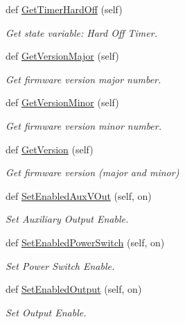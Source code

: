 \begin{DoxyCompactItemize}
def \hyperlink{class_mini_box_d_c_d_c_1_1_dc_dc_converter_1_1_dc_dc_converter_a47ac15981426ea0c5c4e8076030c043b}{Get\+Timer\+Hard\+Off} (self)
\begin{DoxyCompactList}\small\item\em Get state variable\+: Hard Off Timer. \end{DoxyCompactList}\item 
def \hyperlink{class_mini_box_d_c_d_c_1_1_dc_dc_converter_1_1_dc_dc_converter_a7422de9c9cfe5e42f5f290cbaf679f1d}{Get\+Version\+Major} (self)
\begin{DoxyCompactList}\small\item\em Get firmware version major number. \end{DoxyCompactList}\item 
def \hyperlink{class_mini_box_d_c_d_c_1_1_dc_dc_converter_1_1_dc_dc_converter_a8a8a1fdf62c9444ef7a805eafe662618}{Get\+Version\+Minor} (self)
\begin{DoxyCompactList}\small\item\em Get firmware version minor number. \end{DoxyCompactList}\item 
def \hyperlink{class_mini_box_d_c_d_c_1_1_dc_dc_converter_1_1_dc_dc_converter_a845dea85bbf256c0845cf9c499bf64d0}{Get\+Version} (self)
\begin{DoxyCompactList}\small\item\em Get firmware version (major and minor) \end{DoxyCompactList}\item 
def \hyperlink{class_mini_box_d_c_d_c_1_1_dc_dc_converter_1_1_dc_dc_converter_a0a72410596910b622eeb87b1c7aea13d}{Set\+Enabled\+Aux\+V\+Out} (self, on)
\begin{DoxyCompactList}\small\item\em Set Auxiliary Output Enable. \end{DoxyCompactList}\item 
def \hyperlink{class_mini_box_d_c_d_c_1_1_dc_dc_converter_1_1_dc_dc_converter_aec58033ac3f2a394db279b07f23168da}{Set\+Enabled\+Power\+Switch} (self, on)
\begin{DoxyCompactList}\small\item\em Set Power Switch Enable. \end{DoxyCompactList}\item 
def \hyperlink{class_mini_box_d_c_d_c_1_1_dc_dc_converter_1_1_dc_dc_converter_afde90abeae3789288591b9eeca7b26a4}{Set\+Enabled\+Output} (self, on)
\begin{DoxyCompactList}\small\item\em Set Output Enable. \end{DoxyCompactList}\item 

\end{DoxyCompactItemize}
